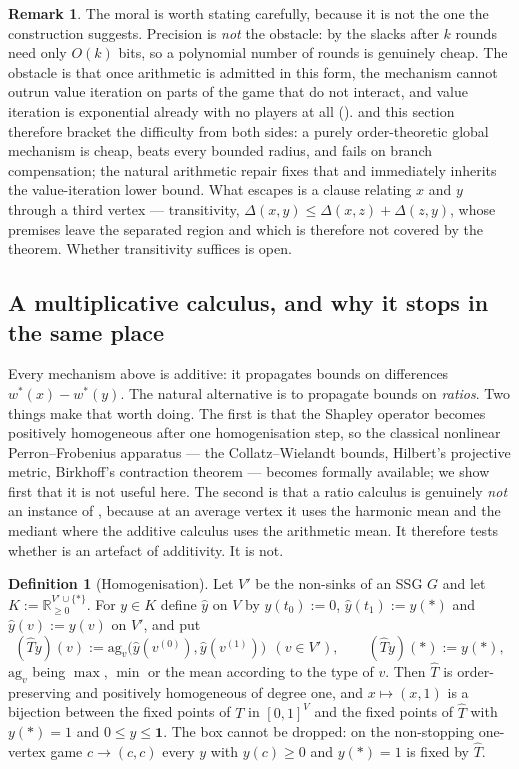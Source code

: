 \documentclass[11pt]{article}
\theoremstyle{plain}
\theoremstyle{definition}
\newtheorem{definition}[theorem]{Definition}
\newtheorem{remark}[theorem]{Remark}
\newcommand{\bbone}{\mathbf{1}}
\begin{document}
\begin{remark}
The moral is worth stating carefully, because it is not the one the
construction suggests. Precision is \emph{not} the obstacle: by
 the slacks after $k$ rounds need only $O(k)$
bits, so a polynomial number of rounds is genuinely cheap. The obstacle
is that once arithmetic is admitted in this form, the mechanism cannot
outrun value iteration on parts of the game that do not interact, and
value iteration is exponential already with no players at all
().  and this section therefore
bracket the difficulty from both sides: a purely order-theoretic global
mechanism is cheap, beats every bounded radius, and fails on branch
compensation; the natural arithmetic repair fixes that and immediately
inherits the value-iteration lower bound. What escapes
 is a clause relating $x$ and $y$ through a third
vertex --- transitivity, $\Delta(x,y)\le\Delta(x,z)+\Delta(z,y)$, whose
premises leave the separated region and which is therefore not covered by
the theorem. Whether transitivity suffices is open.
\end{remark}

\subsection{A multiplicative calculus, and why it stops in the same place}
\label{sec:ratio}

Every mechanism above is additive: it propagates bounds on differences
$w^\ast(x)-w^\ast(y)$. The natural alternative is to propagate bounds on
\emph{ratios}. Two things make that worth doing. The first is that the
Shapley operator becomes positively homogeneous after one homogenisation
step, so the classical nonlinear Perron--Frobenius apparatus --- the
Collatz--Wielandt bounds, Hilbert's projective metric, Birkhoff's
contraction theorem --- becomes formally available; we show first that it
is not useful here. The second is that a ratio calculus is genuinely
\emph{not} an instance of , because at an average vertex
it uses the harmonic mean and the mediant where the additive calculus
uses the arithmetic mean. It therefore tests whether
 is an artefact of additivity. It is not.

\begin{definition}[Homogenisation]\label{def:homog}
Let $V'$ be the non-sinks of an SSG $G$ and let
$K:=\mathbb{R}_{\ge0}^{V'\cup\{\ast\}}$. For $y\in K$ define
$\hat y$ on $V$ by $\hat y(t_0):=0$, $\hat y(t_1):=y(\ast)$ and
$\hat y(v):=y(v)$ on $V'$, and put
\[
  (\widehat Ty)(v):=\mathrm{ag}_v\bigl(\hat y(v^{(0)}),\hat y(v^{(1)})\bigr)
  \ \ (v\in V'),\qquad (\widehat Ty)(\ast):=y(\ast),
\]
$\mathrm{ag}_v$ being $\max$, $\min$ or the mean according to the type of
$v$. Then $\widehat T$ is order-preserving and positively homogeneous of
degree one, and $x\mapsto(x,1)$ is a bijection between the fixed points of
$T$ in $[0,1]^{V}$ and the fixed points of $\widehat T$ with
$y(\ast)=1$ and $0\le y\le\bbone$. The box cannot be dropped: on the
non-stopping one-vertex game $c\to(c,c)$ every $y$ with $y(c)\ge0$ and
$y(\ast)=1$ is fixed by $\widehat T$.
\end{definition}
\end{document}
